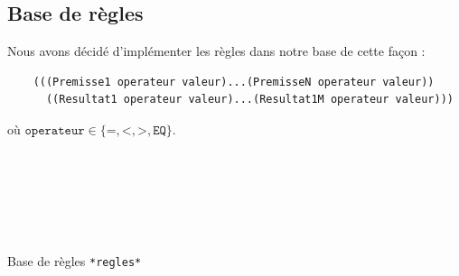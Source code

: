 \documentclass[a4paper,12pt]{article}
\begin{document}
\subsection{Base de règles}
Nous avons décidé d'implémenter les règles dans notre base de cette façon :

\begin{verbatim}
	(((Premisse1 operateur valeur)...(PremisseN operateur valeur))
  	  ((Resultat1 operateur valeur)...(Resultat1M operateur valeur)))
\end{verbatim}
où $\texttt{operateur} \in \{\texttt{=},\texttt{<},\texttt{>},\texttt{EQ}\} $.
\begin{listing}[H]
	\centering
	\inputminted[breaklines=true,linenos,lastline=43]{lisp}{../regles.lisp}
\end{listing}

\begin{listing}[H]
	\centering
	\inputminted[breaklines=true,linenos,firstline=44,lastline=88]{lisp}{../regles.lisp}
\end{listing}

\begin{listing}[H]
	\centering
	\inputminted[breaklines=true,linenos,firstline=89,lastline=126]{lisp}{../regles.lisp}
\end{listing}

\begin{listing}[H]
	\centering
	\inputminted[breaklines=true,linenos,firstline=127,lastline=171]{lisp}{../regles.lisp}
\end{listing}

\begin{listing}[H]
	\centering
	\inputminted[breaklines=true,linenos,firstline=172,lastline=211]{lisp}{../regles.lisp}
\end{listing}

\begin{listing}[H]
	\centering
	\inputminted[breaklines=true,linenos,firstline=212,lastline=254]{lisp}{../regles.lisp}
\end{listing}

\begin{listing}[H]
	\centering
	\inputminted[breaklines=true,linenos,firstline=255,lastline=294]{lisp}{../regles.lisp}
\end{listing}


\begin{listing}[H]
	\centering
	\inputminted[breaklines=true,linenos,firstline=295]{lisp}{../regles.lisp}
	\caption{Base de règles \texttt{*regles*}}
\end{listing}
\end{document}

